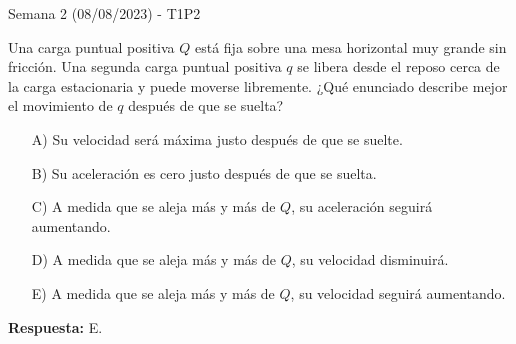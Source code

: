 \begin{frame}{Semana 2 (08/08/2023) - T1P2}
    
    Una carga puntual positiva $Q$ está fija sobre una mesa horizontal muy grande sin fricción. Una segunda carga puntual positiva $q$ se libera desde el reposo cerca de la carga estacionaria y puede moverse libremente. ¿Qué enunciado describe mejor el movimiento de $q$ después de que se suelta?
    
    \begin{itemize}
    
    \item[A)]Su velocidad será máxima justo después de que se suelte.

    \item[B)] Su aceleración es cero justo después de que se suelta.
    
    \item[C)] A medida que se aleja más y más de $Q$, su aceleración seguirá aumentando.
    
    \item[D)] A medida que se aleja más y más de $Q$, su velocidad disminuirá.
    
    \item[E)] A medida que se aleja más y más de $Q$, su velocidad seguirá aumentando.
    \end{itemize}
    
    \pause\bigskip\centering\textbf{Respuesta:} E.
    
\end{frame}

